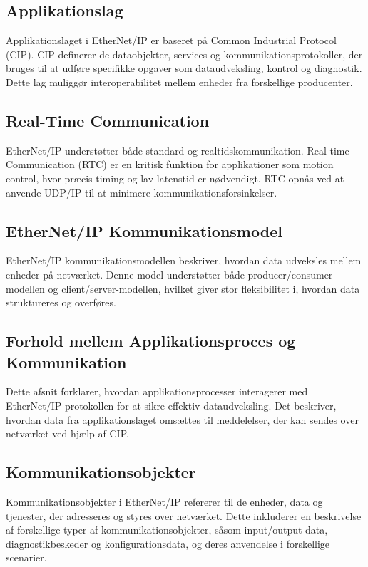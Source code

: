 \subsection*{Applikationslag}
Applikationslaget i EtherNet/IP er baseret på Common Industrial Protocol (CIP). CIP definerer de dataobjekter, services og kommunikationsprotokoller, der bruges til at udføre specifikke opgaver som dataudveksling, kontrol og diagnostik. Dette lag muliggør interoperabilitet mellem enheder fra forskellige producenter.

\subsection*{Real-Time Communication}
EtherNet/IP understøtter både standard og realtidskommunikation. Real-time Communication (RTC) er en kritisk funktion for applikationer som motion control, hvor præcis timing og lav latenstid er nødvendigt. RTC opnås ved at anvende UDP/IP til at minimere kommunikationsforsinkelser.

\subsection{EtherNet/IP Kommunikationsmodel}
EtherNet/IP kommunikationsmodellen beskriver, hvordan data udveksles mellem enheder på netværket. Denne model understøtter både producer/consumer-modellen og client/server-modellen, hvilket giver stor fleksibilitet i, hvordan data struktureres og overføres.

\subsection{Forhold mellem Applikationsproces og Kommunikation}
Dette afsnit forklarer, hvordan applikationsprocesser interagerer med EtherNet/IP-protokollen for at sikre effektiv dataudveksling. Det beskriver, hvordan data fra applikationslaget omsættes til meddelelser, der kan sendes over netværket ved hjælp af CIP.

\subsection{Kommunikationsobjekter}
Kommunikationsobjekter i EtherNet/IP refererer til de enheder, data og tjenester, der adresseres og styres over netværket. Dette inkluderer en beskrivelse af forskellige typer af kommunikationsobjekter, såsom input/output-data, diagnostikbeskeder og konfigurationsdata, og deres anvendelse i forskellige scenarier.

